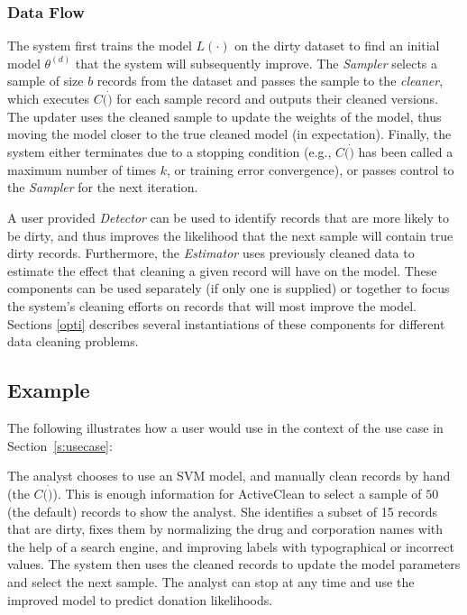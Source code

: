 \subsubsection{Data Flow} \label{df}
The system first trains the model $L(\cdot)$ on the dirty dataset to find an initial model $\theta^(d)$ that the system will subsequently improve.
The {\it Sampler} selects a sample of size $b$ records from the dataset and passes
the sample to the {\it cleaner}, which executes $C(\dot)$ for each sample record and outputs their cleaned versions.
The updater uses the cleaned sample to update the weights of the model, thus moving the model closer to the true cleaned model (in expectation).
Finally, the system either terminates due to a stopping condition (e.g., $C(\dot)$ has been called a maximum number of times $k$, or training error convergence),
or passes control to the {\it Sampler} for the next iteration.

A user provided {\it Detector} can be used to identify records that are more likely to be dirty, and  thus improves the likelihood that the next sample will contain true dirty records.
Furthermore, the {\it Estimator} uses previously cleaned data to estimate the effect that cleaning a given record will have on the model.
These components can be used separately (if only one is supplied) or together to focus the system's cleaning efforts on records that will most improve the model.
Sections \ref{opti} describes several instantiations of these components for different data cleaning problems.

\subsection{Example}

The following illustrates how a user would use \sys in the context of the use case in Section~\ref{s:usecase}:
\begin{example}\label{archex}
The analyst chooses to use an SVM model, and manually clean records by hand (the $C(\dot)$).  
This is enough information for ActiveClean to select a sample of $50$ (the default) records to show the analyst.
She identifies a subset of 15 records that are dirty, fixes them by normalizing the drug and corporation names with the help of a search engine, and improving labels with typographical or incorrect values.
The system then uses the cleaned records to update the model parameters and select the next sample.
The analyst can stop at any time and use the improved model to predict donation likelihoods.
\end{example}






